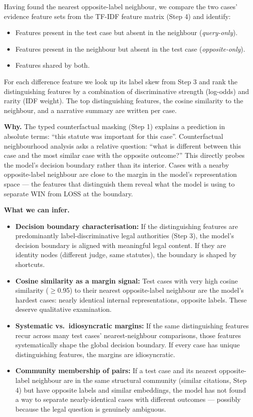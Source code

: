 \documentclass[11pt,a4paper]{article}
\begin{document}
Having found the nearest opposite-label neighbour, we compare the two cases' evidence
feature sets from the TF-IDF feature matrix (Step 4) and identify:
\begin{itemize}
  \item Features present in the test case but absent in the neighbour (\emph{query-only}).
  \item Features present in the neighbour but absent in the test case (\emph{opposite-only}).
  \item Features shared by both.
\end{itemize}
For each difference feature we look up its label skew from Step 3 and rank the
distinguishing features by a combination of discriminative strength (log-odds) and
rarity (IDF weight). The top distinguishing features, the cosine similarity to the
neighbour, and a narrative summary are written per case.

\textbf{Why.}
The typed counterfactual masking (Step 1) explains a prediction in absolute terms:
``this statute was important for this case''. Counterfactual neighbourhood analysis
asks a relative question: ``what is different between this case and the most similar
case with the opposite outcome?'' This directly probes the model's decision boundary
rather than its interior. Cases with a nearby opposite-label neighbour are close to
the margin in the model's representation space --- the features that distinguish them
reveal what the model is using to separate WIN from LOSS at the boundary.

\textbf{What we can infer.}
\begin{itemize}
  \item \textbf{Decision boundary characterisation:} If the distinguishing features
    are predominantly label-discriminative legal authorities (Step 3), the model's
    decision boundary is aligned with meaningful legal content. If they are identity
    nodes (different judge, same statutes), the boundary is shaped by shortcuts.
  \item \textbf{Cosine similarity as a margin signal:} Test cases with very high
    cosine similarity ($\geq$0.95) to their nearest opposite-label neighbour are the
    model's hardest cases: nearly identical internal representations, opposite labels.
    These deserve qualitative examination.
  \item \textbf{Systematic vs.\ idiosyncratic margins:} If the same distinguishing
    features recur across many test cases' nearest-neighbour comparisons, those features
    systematically shape the global decision boundary. If every case has unique
    distinguishing features, the margins are idiosyncratic.
  \item \textbf{Community membership of pairs:} If a test case and its nearest
    opposite-label neighbour are in the same structural community (similar citations,
    Step 4) but have opposite labels and similar embeddings, the model has not found
    a way to separate nearly-identical cases with different outcomes --- possibly
    because the legal question is genuinely ambiguous.
\end{itemize}
\end{document}
